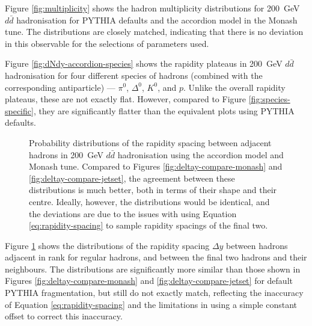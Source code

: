 \documentclass[12pt,a4paper]{report}
\begin{document}
Figure \ref{fig:multiplicity} shows the hadron multiplicity distributions for \qty{200}{\giga\electronvolt} $d\bar{d}$ hadronisation for PYTHIA defaults and the accordion model in the Monash tune. The distributions are closely matched, indicating that there is no deviation in this observable for the selections of parameters used.

Figure \ref{fig:dNdy-accordion-species} shows the rapidity plateaus in \qty{200}{\giga\electronvolt} $d\bar{d}$ hadronisation for four different species of hadrons (combined with the corresponding antiparticle) --- $\pi^0$, $\Delta^0$, $K^0$, and $p$. Unlike the overall rapidity plateaus, these are not exactly flat. However, compared to Figure \ref{fig:species-specific}, they are significantly flatter than the equivalent plots using PYTHIA defaults.

\begin{figure}
  \centering
  
  \caption{Probability distributions of the rapidity spacing between adjacent hadrons in \qty{200}{\giga\electronvolt} $d\bar{d}$ hadronisation using the accordion model and Monash tune. Compared to Figures \ref{fig:deltay-compare-monash} and \ref{fig:deltay-compare-jetset}, the agreement between these distributions is much better, both in terms of their shape and their centre. Ideally, however, the distributions would be identical, and the deviations are due to the issues with using Equation \eqref{eq:rapidity-spacing} to sample rapidity spacings of the final two.}
  \label{fig:deltay-compare-accordion}
\end{figure}

Figure \ref{fig:deltay-compare-accordion} shows the distributions of the rapidity spacing $\Delta y$ between hadrons adjacent in rank for regular hadrons, and between the final two hadrons and their neighbours. The distributions are significantly more similar than those shown in Figures \ref{fig:deltay-compare-monash} and \ref{fig:deltay-compare-jetset} for default PYTHIA fragmentation, but still do not exactly match, reflecting the inaccuracy of Equation \eqref{eq:rapidity-spacing} and the limitations in using a simple constant offset to correct this inaccuracy.
\end{document}
